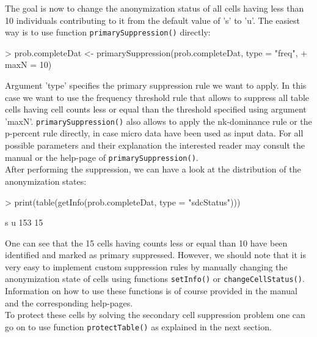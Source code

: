 \documentclass{article}
\begin{document}
The goal is now to change the anonymization status of all cells having less than
10 individuals contributing to it from the default value of 's' to 'u'. The
easiest way is to use function {\tt primarySuppression()} directly:

\begin{Schunk}
\begin{Sinput}
> prob.completeDat <- primarySuppression(prob.completeDat, type = "freq", 
+     maxN = 10)
\end{Sinput}
\end{Schunk}
Argument 'type' specifies the primary suppression rule we want to apply. In this
case we want to use the frequency threshold rule that allows to suppress all
table cells having cell counts less or equal than the threshold specified using 
argument 'maxN'. {\tt primarySuppression()} also allows to apply the nk-dominance 
rule or the p-percent rule directly, in case micro data have been used as input 
data. For all possible parameters and their explanation the interested reader 
may  consult the manual or the help-page of {\tt primarySuppression()}. \\

After performing the suppression, we can have a look at the distribution
of the anonymization states:

\begin{Schunk}
\begin{Sinput}
> print(table(getInfo(prob.completeDat, type = "sdcStatus")))
\end{Sinput}
\begin{Soutput}
  s   u 
153  15 
\end{Soutput}
\end{Schunk}


One can see that the 15 cells having counts less or equal than
10 have been identified and marked as primary suppressed. However, we should note
that it is very easy to implement custom suppression rules by manually changing
the anonymization state of cells using functions {\tt setInfo()} or 
{\tt changeCellStatus()}. Information on how to use these functions is of course
provided in the manual and the corresponding help-pages. \\ 

To protect these cells by solving the secondary cell suppression problem one can 
go on to use function {\tt protectTable()} as explained in the next section.
\end{document}
